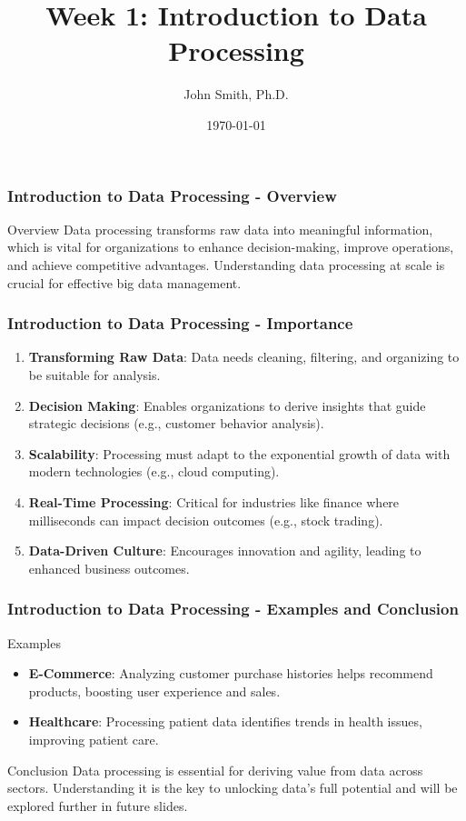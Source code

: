 \documentclass[aspectratio=169]{beamer}
\title[Introduction to Data Processing]{Week 1: Introduction to Data Processing}
\author{John Smith, Ph.D.}
\institute{Department of Computer Science\\ University Name}
\date{\today}
\begin{document}
\frame{\titlepage}

\begin{frame}[fragile]
    \frametitle{Introduction to Data Processing - Overview}
    \begin{block}{Overview}
        Data processing transforms raw data into meaningful information, which is vital for organizations to enhance decision-making, improve operations, and achieve competitive advantages.
        Understanding data processing at scale is crucial for effective big data management.
    \end{block}
\end{frame}

\begin{frame}[fragile]
    \frametitle{Introduction to Data Processing - Importance}
    \begin{enumerate}
        \item \textbf{Transforming Raw Data}: Data needs cleaning, filtering, and organizing to be suitable for analysis.
        
        \item \textbf{Decision Making}: Enables organizations to derive insights that guide strategic decisions (e.g., customer behavior analysis).
        
        \item \textbf{Scalability}: Processing must adapt to the exponential growth of data with modern technologies (e.g., cloud computing).
        
        \item \textbf{Real-Time Processing}: Critical for industries like finance where milliseconds can impact decision outcomes (e.g., stock trading).
        
        \item \textbf{Data-Driven Culture}: Encourages innovation and agility, leading to enhanced business outcomes.
    \end{enumerate}
\end{frame}

\begin{frame}[fragile]
    \frametitle{Introduction to Data Processing - Examples and Conclusion}
    \begin{block}{Examples}
        \begin{itemize}
            \item \textbf{E-Commerce}: Analyzing customer purchase histories helps recommend products, boosting user experience and sales.
            \item \textbf{Healthcare}: Processing patient data identifies trends in health issues, improving patient care.
        \end{itemize}
    \end{block}

    \begin{block}{Conclusion}
        Data processing is essential for deriving value from data across sectors. Understanding it is the key to unlocking data's full potential and will be explored further in future slides.
    \end{block}
\end{frame}
\end{document}
